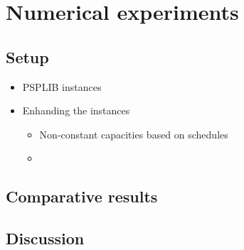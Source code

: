 \chapter{Numerical experiments}

\section{Setup}

\begin{itemize}
    \item PSPLIB instances
    \item Enhanding the instances
    \begin{itemize}
        \item Non-constant capacities based on schedules
        \item 
    \end{itemize}
\end{itemize}

\section{Comparative results}

\section{Discussion}
